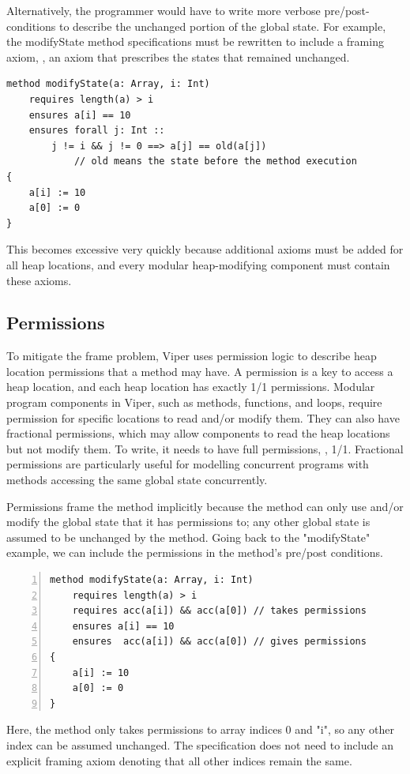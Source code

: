 \documentclass[msc,oneside]{ubcthesis}
\begin{document}
Alternatively, the programmer would have to write more verbose pre/post-conditions to describe the unchanged portion of the global state. For example, the modifyState method specifications must be rewritten to include a framing axiom, \ie, an axiom that prescribes the states that remained unchanged.
\begin{lstlisting}
method modifyState(a: Array, i: Int)
    requires length(a) > i
    ensures a[i] == 10
    ensures forall j: Int ::   
        j != i && j != 0 ==> a[j] == old(a[j])  
            // old means the state before the method execution 
{
    a[i] := 10
    a[0] := 0
}
\end{lstlisting}
This becomes excessive very quickly because additional axioms must be added for all heap locations, and every modular heap-modifying component must contain these axioms. 


\subsection{Permissions}
To mitigate the frame problem, Viper uses permission logic to describe heap location permissions that a method may have. A permission is a key to access a heap location, and each heap location has exactly 1/1 permissions. Modular program components in Viper, such as methods, functions, and loops, require permission for specific locations to read and/or modify them. They can also have fractional permissions, which may allow components to read the heap locations but not modify them. To write, it needs to have full permissions, \ie, 1/1. Fractional permissions are particularly useful for modelling concurrent programs with methods accessing the same global state concurrently.

Permissions frame the method implicitly because the method can only use and/or modify the global state that it has permissions to; any other global state is assumed to be unchanged by the method. Going back to the "modifyState" example, we can include the permissions in the method's pre/post conditions.  
\begin{lstlisting}[language=silver,numbers=left, firstnumber=1, stepnumber=1]
method modifyState(a: Array, i: Int)
    requires length(a) > i
    requires acc(a[i]) && acc(a[0]) // takes permissions
    ensures a[i] == 10
    ensures  acc(a[i]) && acc(a[0]) // gives permissions
{
    a[i] := 10
    a[0] := 0
}
\end{lstlisting}
Here, the method only takes permissions to array indices 0 and "i", so any other index can be assumed unchanged. The specification does not need to include an explicit framing axiom denoting that all other indices remain the same.
\end{document}

